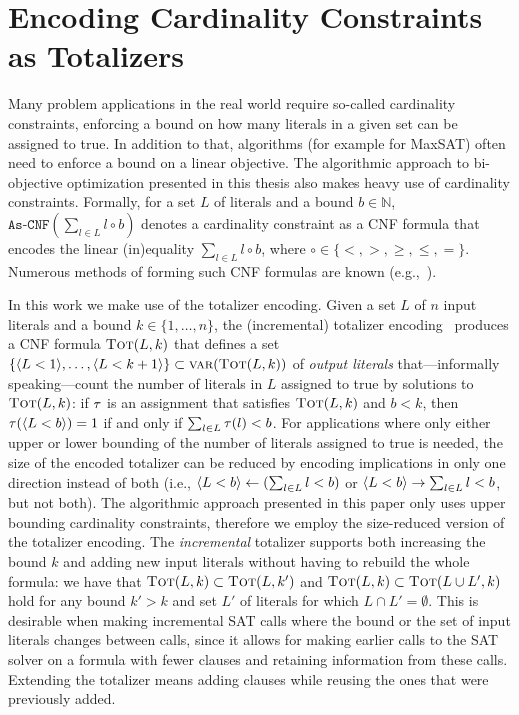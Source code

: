 \section{Encoding Cardinality Constraints as Totalizers\label{sec:card-const}}

Many problem applications in the real world require so-called cardinality constraints, enforcing a bound on how many literals in a given set can be assigned to true.
In addition to that, algorithms (for example for MaxSAT) often need to enforce a bound on a linear objective.
The algorithmic approach to bi-objective optimization presented in this thesis also makes heavy use of cardinality constraints.
Formally, for a set $L$ of literals and a bound $b \in \mathbb{N}$, $\texttt{As-CNF}\left(\sum_{l \in L} l \circ b\right)$ denotes a cardinality constraint as a CNF formula that encodes the linear (in)equality $\sum_{l \in L} l \circ b$, where $\circ \in \{< ,> ,\geq, \leq, =\}$.
Numerous methods of forming such CNF formulas are known (e.g.,~\autocites{DBLP:conf/cp/BailleuxB03,DBLP:conf/cp/Sinz05,DBLP:journals/jsat/EenS06}).

In this work we make use of the totalizer encoding.
Given a set $L$ of $n$ input literals and a bound $k\in\{1,\dots,n\}$, the (incremental) totalizer encoding~\autocites{DBLP:conf/cp/BailleuxB03,DBLP:conf/cp/MartinsJML14} produces a CNF formula $\textsc{Tot}(L, k)$ that defines a set $\{\langle L < 1 \rangle, \ldots, \langle L < k+1 \rangle\} \subset \textsc{var}(\textsc{Tot}(L,k))$ of \emph{output literals} that---informally speaking---count the number of literals in $L$ assigned to true by solutions to $\textsc{Tot}(L,k)$:
if $\tau$ is an assignment that satisfies $\textsc{Tot}(L,k)$ and $b < k$, then $\tau(\langle L < b \rangle) = 1$ if and only if $\sum_{l \in L} \tau(l) < b$.
For applications where only either upper or lower bounding of the number of literals assigned to true is needed, the size of the encoded totalizer can be reduced by encoding implications in only one direction instead of both (i.e., $\langle L < b \rangle \leftarrow (\sum_{l \in L} l < b)$ or $\langle L < b \rangle \rightarrow \sum_{l \in L} l < b$, but not both).
The algorithmic approach presented in this paper only uses upper bounding cardinality constraints, therefore we employ the size-reduced version of the totalizer encoding.
The \emph{incremental} totalizer supports both increasing the bound $k$ and adding new input literals without having to rebuild the whole formula:
we have that $\textsc{Tot}(L, k) \subset \textsc{Tot}(L, k')$ and $\textsc{Tot}(L, k) \subset  \textsc{Tot}(L \cup L', k)$ hold for any bound $k' > k$ and set $L'$ of literals for which $L \cap L' =  \emptyset$. 
This is desirable when making incremental SAT calls where the bound or the set of input literals changes between calls, since it allows for making earlier calls to the SAT solver on a formula with fewer clauses and retaining information from these calls.
Extending the totalizer means adding clauses while reusing the ones that were previously added.

